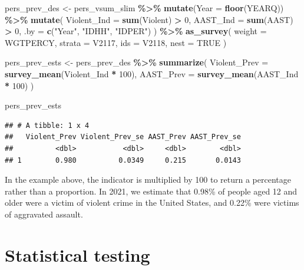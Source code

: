 \documentclass[
]{krantz}
\makeatletter
\newenvironment{Shaded}{\begin{snugshade}}{\end{snugshade}}
\newcommand{\AttributeTok}[1]{\textcolor[rgb]{0.27,0.27,0.27}{#1}}
\newcommand{\ConstantTok}[1]{\textcolor[rgb]{0.37,0.37,0.37}{#1}}
\newcommand{\DecValTok}[1]{\textcolor[rgb]{0.06,0.06,0.06}{#1}}
\newcommand{\FunctionTok}[1]{\textcolor[rgb]{0.27,0.27,0.27}{\textbf{#1}}}
\newcommand{\NormalTok}[1]{#1}
\newcommand{\OtherTok}[1]{\textcolor[rgb]{0.37,0.37,0.37}{#1}}
\newcommand{\SpecialCharTok}[1]{\textcolor[rgb]{0.43,0.43,0.43}{\textbf{#1}}}
\newcommand{\StringTok}[1]{\textcolor[rgb]{0.5,0.5,0.5}{#1}}
\newenvironment{kframe}{%
\medskip{}
\setlength{\fboxsep}{.8em}
 \def\at@end@of@kframe{}%
 \ifinner\ifhmode%
  \def\at@end@of@kframe{\end{minipage}}%
  \begin{minipage}{\columnwidth}%
 \fi\fi%
 \def\FrameCommand##1{\hskip\@totalleftmargin \hskip-\fboxsep
 \colorbox{shadecolor}{##1}\hskip-\fboxsep
     \hskip-\linewidth \hskip-\@totalleftmargin \hskip\columnwidth}%
 \MakeFramed {\advance\hsize-\width
   \@totalleftmargin\z@ \linewidth\hsize
   \@setminipage}}%
 {\par\unskip\endMakeFramed%
 \at@end@of@kframe}
\renewenvironment{Shaded}{\begin{kframe}}{\end{kframe}}
\makeatother
\begin{document}
\begin{Shaded}
\begin{Highlighting}[]
\NormalTok{pers\_prev\_des }\OtherTok{\textless{}{-}}
\NormalTok{  pers\_vsum\_slim }\SpecialCharTok{\%\textgreater{}\%}
  \FunctionTok{mutate}\NormalTok{(}\AttributeTok{Year =} \FunctionTok{floor}\NormalTok{(YEARQ)) }\SpecialCharTok{\%\textgreater{}\%}
  \FunctionTok{mutate}\NormalTok{(}
    \AttributeTok{Violent\_Ind =} \FunctionTok{sum}\NormalTok{(Violent) }\SpecialCharTok{\textgreater{}} \DecValTok{0}\NormalTok{,}
    \AttributeTok{AAST\_Ind =} \FunctionTok{sum}\NormalTok{(AAST) }\SpecialCharTok{\textgreater{}} \DecValTok{0}\NormalTok{,}
    \AttributeTok{.by =} \FunctionTok{c}\NormalTok{(}\StringTok{"Year"}\NormalTok{, }\StringTok{"IDHH"}\NormalTok{, }\StringTok{"IDPER"}\NormalTok{)}
\NormalTok{  ) }\SpecialCharTok{\%\textgreater{}\%}
  \FunctionTok{as\_survey}\NormalTok{(}
    \AttributeTok{weight =}\NormalTok{ WGTPERCY,}
    \AttributeTok{strata =}\NormalTok{ V2117,}
    \AttributeTok{ids =}\NormalTok{ V2118,}
    \AttributeTok{nest =} \ConstantTok{TRUE}
\NormalTok{  )}

\NormalTok{pers\_prev\_ests }\OtherTok{\textless{}{-}}\NormalTok{ pers\_prev\_des }\SpecialCharTok{\%\textgreater{}\%}
  \FunctionTok{summarize}\NormalTok{(}
    \AttributeTok{Violent\_Prev =} \FunctionTok{survey\_mean}\NormalTok{(Violent\_Ind }\SpecialCharTok{*} \DecValTok{100}\NormalTok{),}
    \AttributeTok{AAST\_Prev =} \FunctionTok{survey\_mean}\NormalTok{(AAST\_Ind }\SpecialCharTok{*} \DecValTok{100}\NormalTok{)}
\NormalTok{  )}

\NormalTok{pers\_prev\_ests}
\end{Highlighting}
\end{Shaded}

\begin{verbatim}
## # A tibble: 1 x 4
##   Violent_Prev Violent_Prev_se AAST_Prev AAST_Prev_se
##          <dbl>           <dbl>     <dbl>        <dbl>
## 1        0.980          0.0349     0.215       0.0143
\end{verbatim}

In the example above, the indicator is multiplied by 100 to return a percentage rather than a proportion. In 2021, we estimate that 0.98\% of people aged 12 and older were a victim of violent crime in the United States, and 0.22\% were victims of aggravated assault.

\hypertarget{statistical-testing}{%
\section{Statistical testing}\label{statistical-testing}}
\end{document}
